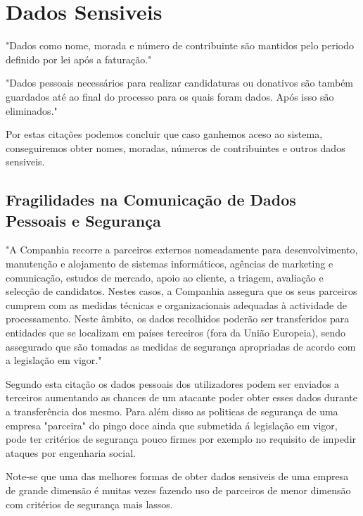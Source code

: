 \section{Dados Sensiveis}

\par "Dados como nome, morada e número de contribuinte são mantidos pelo periodo definido por lei após a faturação."\newline

\par "Dados pessoais necessários para realizar candidaturas ou donativos são também guardados até ao final do processo para os quais foram dados. Após isso são eliminados."\newline

\par Por estas citações podemos concluir que caso ganhemos aceso ao sistema, conseguiremos obter nomes, moradas, números de contribuintes e outros dados sensiveis.



\subsection{Fragilidades na Comunicação de Dados Pessoais e Segurança}


\par "A Companhia recorre a parceiros externos nomeadamente para desenvolvimento, manutenção e alojamento de sistemas informáticos, agências de marketing e comunicação, estudos de mercado, apoio ao cliente, a triagem, avaliação e selecção de candidatos. Nestes casos, a Companhia assegura que os seus parceiros cumprem com as medidas técnicas e organizacionais adequadas à actividade de processamento. Neste âmbito, os dados recolhidos poderão ser transferidos para entidades que se localizam em países terceiros (fora da União Europeia), sendo assegurado que são tomadas as medidas de segurança apropriadas de acordo com a legislação em vigor."\newline


\par Segundo esta citação os dados pessoais dos utilizadores podem ser enviados a terceiros aumentando as chances de um atacante poder obter esses dados durante a transferência dos mesmo. Para além disso as politicas de segurança de uma empresa "parceira" do pingo doce ainda que submetida á legislação em vigor, pode ter critérios de segurança pouco firmes por exemplo no requisito de impedir ataques por engenharia social.\newline
\par Note-se que uma das melhores formas de obter dados sensiveis de uma empresa de grande dimensão é muitas vezes fazendo uso de parceiros de menor dimensão com critérios de segurança mais lassos.


